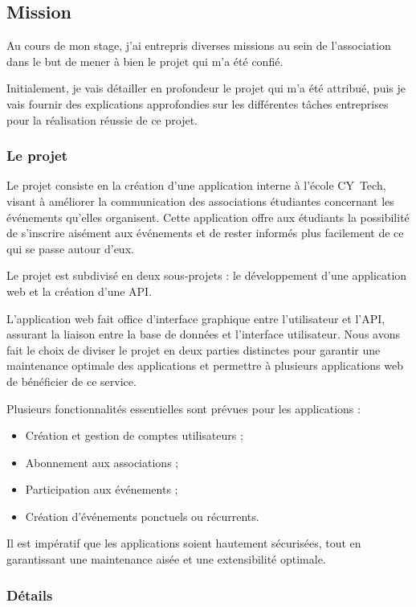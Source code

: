 \subsection{Mission}

Au cours de mon stage, j'ai entrepris diverses missions au sein de l'association dans le but de mener à bien le projet qui m'a été confié.

Initialement, je vais détailler en profondeur le projet qui m'a été attribué, puis je vais fournir des explications approfondies sur les différentes tâches entreprises pour la réalisation réussie de ce projet.

\subsubsection{Le projet}

Le projet consiste en la création d'une application interne à l'école CY~Tech, visant à améliorer la communication des associations étudiantes concernant les événements qu'elles organisent. Cette application offre aux étudiants la possibilité de s'inscrire aisément aux événements et de rester informés plus facilement de ce qui se passe autour d'eux.

Le projet est subdivisé en deux sous-projets : le développement d'une application web et la création d'une API.

L'application web fait office d'interface graphique entre l'utilisateur et l'API, assurant la liaison entre la base de données et l'interface utilisateur. Nous avons fait le choix de diviser le projet en deux parties distinctes pour garantir une maintenance optimale des applications et permettre à plusieurs applications web de bénéficier de ce service.

Plusieurs fonctionnalités essentielles sont prévues pour les applications :
\begin{itemize}
	\item Création et gestion de comptes utilisateurs ;
	\item Abonnement aux associations ;
	\item Participation aux événements ;
	\item Création d'événements ponctuels ou récurrents.
\end{itemize}

Il est impératif que les applications soient hautement sécurisées, tout en garantissant une maintenance aisée et une extensibilité optimale.
\subsubsection{Détails}